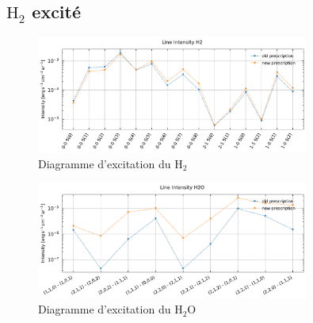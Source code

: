 \begin{appendices}
\section{$\mathrm{H}_2$ excité}
\label{appendix:type46}
\begin{figure}[!h]
    \centering \includegraphics[trim = {0 0 0 1cm},clip,width=0.8\textwidth]{figure/type46/I_comp_H2.pdf}
    \caption{Diagramme d'excitation du $\mathrm{H}_2$}
    \begin{minipage}{\textwidth}
    
    \end{minipage}
    \label{fig:type46:H2}
\end{figure}

\begin{figure}[!h]
    \centering \includegraphics[trim = {0 0 0 1cm},clip,width=0.8\textwidth]{figure/type46/I_comp_H2O.pdf}
    \caption{Diagramme d'excitation du $\mathrm{H}_2\mathrm{O}$}
    \begin{minipage}{\textwidth}
  
    \end{minipage}
    \label{fig:type46:H2O}
\end{figure}



\end{appendices}
